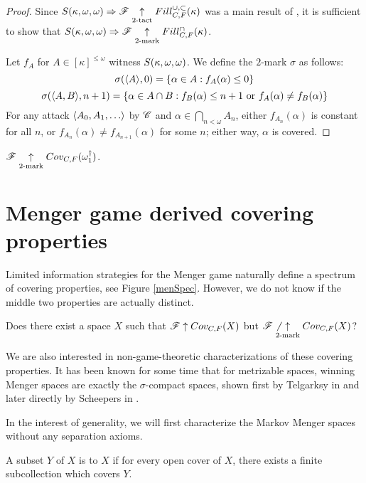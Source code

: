 \begin{proof}
  Since $S(\kappa,\omega,\omega)\Rightarrow\mathscr{F} \underset{2\text{-tact}}{\uparrow}Fill^{\cup,\subset}_{C,F}(\kappa)$ was
  a main result of \cite{MR1129143}, it is sufficient to show that
  $S(\kappa,\omega,\omega)\Rightarrow \mathscr{F} \underset{2\text{-mark}}{\uparrow}Fill^{\cap}_{C,F}(\kappa)$.

  Let $f_A$ for $A\in[\kappa]^{\leq\omega}$ witness $S(\kappa,\omega,\omega)$. We define
  the $2$-mark $\sigma$ as follows:
    \[
      \sigma(\langle A\rangle,0) = \{\alpha\in A: f_A(\alpha) \leq 0 \}
    \]
    \[
      \sigma(\langle A,B\rangle,n+1)
        =
      \{
        \alpha \in A\cap B
      :
        f_B(\alpha) \leq n+1 \text{ or }
        f_A(\alpha)\not=f_B(\alpha)
      \}
    \]
  For any attack $\<A_0,A_1,\dots\>$ by $\mathscr{C}$ and
  $\alpha\in\bigcap_{n<\omega}A_n$, either $f_{A_n}(\alpha)$ is constant for
  all $n$, or $f_{A_n}(\alpha)\not=f_{A_{n+1}}(\alpha)$ for some $n$;
  either way, $\alpha$ is covered.
\end{proof}

\begin{cor}
  $\mathscr{F} \underset{2\text{-mark}}{\uparrow}Cov_{C,F}(\omega^\dagger_1)$.
\end{cor}



\section{Menger game derived covering properties}

Limited information strategies for the Menger game naturally define a spectrum
of covering properties, see Figure \ref{menSpec}. However,
we do not know if the middle two properties are actually distinct.



\begin{ques}\label{perfectTo2Mark}
  Does there exist a space $X$ such that $\mathscr{F} \uparrow Cov_{C,F}(X)$ but
  $\mathscr{F} \not\underset{2\text{-mark}}{\uparrow} Cov_{C,F}(X)$?
\end{ques}

We are also interested in non-game-theoretic characterizations of these
covering properties. It has been known for some time that for metrizable spaces,
winning Menger spaces are exactly the $\sigma$-compact spaces, shown first
by Telgarksy in \cite{MR753073} and later directly by Scheepers in
\cite{MR1273523}.

In the interest of generality, we will first characterize the Markov Menger
spaces without any separation axioms.

\begin{defn}
  A subset $Y$ of $X$ is  to $X$ if for every open
  cover of $X$, there exists a finite subcollection which covers $Y$.
\end{defn}

